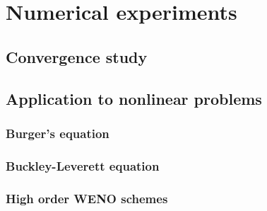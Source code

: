 \section{Numerical experiments}\label{sec:numerics}
    \subsection{Convergence study}
    \subsection{Application to nonlinear problems}
        \subsubsection{Burger's equation}
        \subsubsection{Buckley-Leverett equation}
        \subsubsection{High order WENO schemes}
        
        
        
